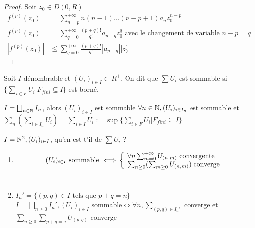 \documentclass[]{report}
\begin{document}
\begin{proof}{}{}
    Soit $z_0\in D(0,R)$\\
    \begin{align*}f^{(p)}(z_0)&=\sum_{n=p}^{+\infty}n(n-1)\ldots(n-p+1)a_nz_0^{n-p}\\
    f^{(p)}(z_0)&=\sum_{q=0}^{+\infty}\frac{(p+q)!}{q!}a_{p+q}z_0^q\text{ avec le changement de variable $n-p=q$}\\
    |f^{(p)}(z_0)|&\leq \sum_{q=0}^{+\infty}\frac{(p+q)!}{q!}|a_{p+q}||z_0^q|
    \end{align*}
\end{proof}

\begin{ra}{}{}
    Soit $I$ dénombrable et $(U_i)_{i\in I} \subset R^+$. On dit que $\sum U_i$ est sommable si $\{\sum_{i\in F}U_i |F_{fini}\subseteq I\}$ est borné.
\end{ra}

\begin{prop}{}{}
    $I=\bigsqcup_{n\in \mathbb{N}}I_n$, alors $(U_i)_{i\in I}$ est sommable \ssi $\forall n\in\mathbb{N}, (U_i)_{i\in I_n}$ est sommable et $\sum_n(\sum_{i\in I_n}U_i)=\sum_{i\in I }U_i:=\sup\{\sum_{i\in F}U_i|F_{fini}\subseteq I\}$
\end{prop}

\begin{ex}{}{}
    $I=\mathbb{N}^2,(U_i)_{i\in I}$, qu'en est-t'il de $\sum U_i $ ?
    \begin{enumerate}
        \item
            \[\text{$(U_i)_{i\in I}$ sommable $\iff$}\left\{\begin{array}{ll} \forall n \sum_{m=0}^{+\infty}U_{(n,m)} \text{ convergente}\\
            \sum_{n\ge0}(\sum_{m\ge0} U_{(n,m)}) \text{ converge} \end{array} \right.\]\\
        \item $I_n'=\{(p,q)\in I \text{ tels que } p+q=n\}$\\
            $I=\bigsqcup_{n\ge0}I_n',(U_i)_{i\in I} $ sommable$\iff\forall n,\sum_{(p,q)\in I_n'}$ converge et $\sum_{n\ge0}\sum_{p+q=n}U_{(p,q)}$ converge
    \end{enumerate}
\end{ex}
\end{document}
